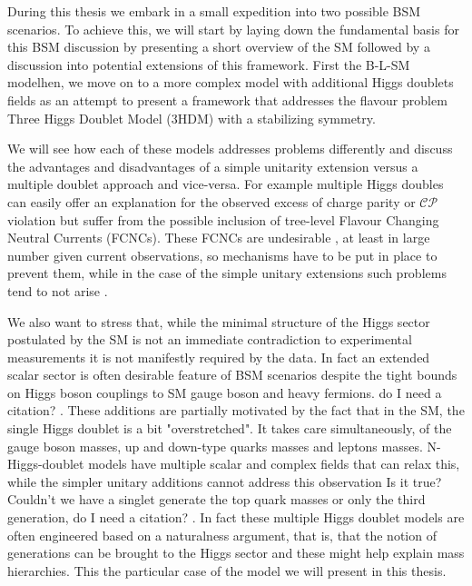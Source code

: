 
During this thesis we embark in a small expedition into two possible BSM scenarios.
%
To achieve this, we will start by laying down the fundamental basis for this BSM discussion by presenting a short overview of the SM followed by a discussion into potential extensions of this framework. First  the B-L-SM modelhen, we move on to a more complex model with additional Higgs doublets fields as  an attempt to present a framework that addresses the flavour problem  Three Higgs Doublet Model (3HDM) with a stabilizing symmetry.

We will see how each of these models addresses problems differently and discuss the advantages and disadvantages of a simple unitarity extension versus a multiple doublet approach and vice-versa. 
%
For example\Joaoadd{,} multiple Higgs doubles can easily offer an explanation for the observed excess of charge parity or $\mathcal{CP}$ violation but suffer from the possible inclusion of tree-level Flavour Changing Neutral Currents (FCNCs). These FCNCs are undesirable \cite{ILYUSHIN2020114921}, at least in large number given current observations, so mechanisms have to be put in place to prevent them, while in the case of the simple unitary extensions such problems tend to not arise \cite{Huitu2019}. 

We also want to stress that, while the minimal structure of the Higgs sector postulated by the SM is not an immediate contradiction to experimental measurements it is not manifestly required by the data. 
%
In fact\Joaoadd{,} an extended scalar sector is often desirable feature of BSM scenarios despite the tight bounds on Higgs boson couplings to  SM gauge boson and heavy fermions. {\color{red} do I need a citation?} .   
%
These additions are partially motivated by the fact that in the SM, the single Higgs doublet is a bit "overstretched".  It  takes  care  \Joaoadd{,}simultaneously, of the gauge boson masses, up and down-type quarks masses and leptons masses. 
%
N-Higgs-doublet models have multiple scalar and complex fields that can relax this, while the simpler unitary additions cannot address this observation {\color{red} Is it true? Couldn't we have a singlet generate the top quark masses or only the third generation, do I need a citation?} .   
%
In fact these multiple Higgs doublet models are often engineered based on a naturalness argument, that is, that the  notion  of  generations  can  be  brought  to  the  Higgs  sector and these might help explain mass hierarchies. This  the particular case of the model we will present in this thesis. 


